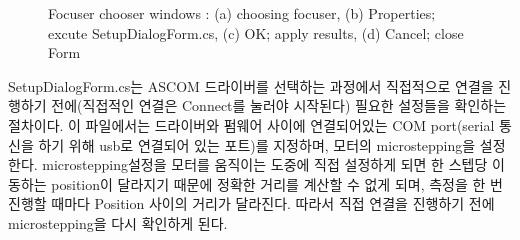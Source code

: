 \begin{figure}[h]
	\begin{center}
	\end{center}
	\caption{Focuser chooser windows : (a) choosing focuser, (b) Properties; excute SetupDialogForm.cs, (c) OK; apply results, (d) Cancel; close Form}
\label{fig:focuserchooser}	
\end{figure}

SetupDialogForm.cs는 ASCOM 드라이버를 선택하는 과정에서 직접적으로 연결을 진행하기 전에(직접적인 연결은 Connect를 눌러야 시작된다) 필요한 설정들을 확인하는 절차이다. 이 파일에서는 드라이버와 펌웨어 사이에 연결되어있는 COM port(serial 통신을 하기 위해 usb로 연결되어 있는 포트)를 지정하며, 모터의 microstepping을 설정한다. microstepping설정을 모터를 움직이는 도중에 직접 설정하게 되면 한 스텝당 이동하는 position이 달라지기 때문에 정확한 거리를 계산할 수 없게 되며, 측정을 한 번 진행할 때마다 Position 사이의 거리가 달라진다. 따라서 직접 연결을 진행하기 전에 microstepping을 다시 확인하게 된다.

